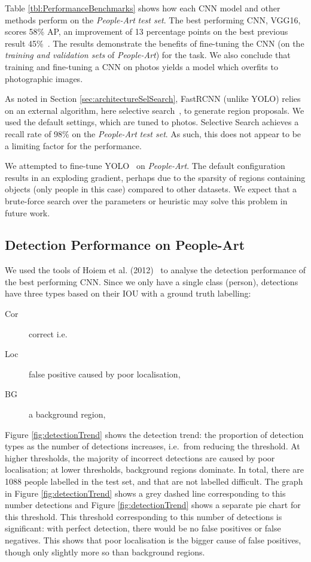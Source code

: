 \documentclass[runningheads]{llncs}
\begin{document}
Table \ref{tbl:PerformanceBenchmarks} shows how each \ac{CNN} model and other methods perform on the \textit{People-Art} \textit{test set}.
The best performing \ac{CNN}, VGG16, scores 58\% \ac{AP}, an improvement of 13 percentage points on the best previous result 45\%~\cite{redmon2015you}.
The results demonstrate the benefits of fine-tuning the \ac{CNN} (on the \textit{training and validation sets} of \textit{People-Art}) for the task.
We also conclude that training and fine-tuning a \ac{CNN} on \acp{photo} yields a model which overfits to photographic images.

As noted in Section \ref{sec:architectureSelSearch}, \ac{FastRCNN} (unlike \ac{YOLO}) relies on an external algorithm, here selective search~\cite{uijlings2013selective}, to generate region proposals.
We used the default settings, which are tuned to \acp{photo}.
Selective Search achieves a recall rate of 98\%  on the \textit{People-Art} \textit{test set}.
As such, this does not appear to be a limiting factor for the performance.

We attempted to fine-tune \ac{YOLO}~\cite{redmon2015you} on \textit{People-Art}.
The default configuration results in an exploding gradient, perhaps due to the sparsity of regions containing objects (only people in this case) compared to other datasets.
We expect that a brute-force search over the parameters or heuristic may solve this problem in future work.

\subsection{Detection Performance on People-Art}
We used the tools of Hoiem et al. (2012)~\cite{hoiem2012diagnosing} to analyse the detection performance of the best performing \ac{CNN}.
Since we only have a single class (person), detections have three types based on their \ac{IOU} with a ground truth labelling:
\begin{description}
\item[Cor] correct i.e.\

\item[Loc] false positive caused by poor localisation, 

\item[BG] a background region,

\end{description}

Figure \ref{fig:detectionTrend} shows the detection trend: the proportion of detection types as the number of detections increases, i.e.\ from reducing the threshold.
At higher thresholds, the majority of incorrect detections are caused by poor localisation; at lower thresholds, background regions dominate.
In total, there are 1088 people labelled in the test set, and that are not labelled difficult.
The graph in Figure \ref{fig:detectionTrend} shows a grey dashed line corresponding to this number detections and Figure \ref{fig:detectionTrend} shows a separate pie chart for this threshold.
This threshold corresponding to this number of detections is significant: with perfect detection, there would be no false positives or false negatives.
This shows that poor localisation is the bigger cause of false positives, though only slightly more so than background regions.
\end{document}
